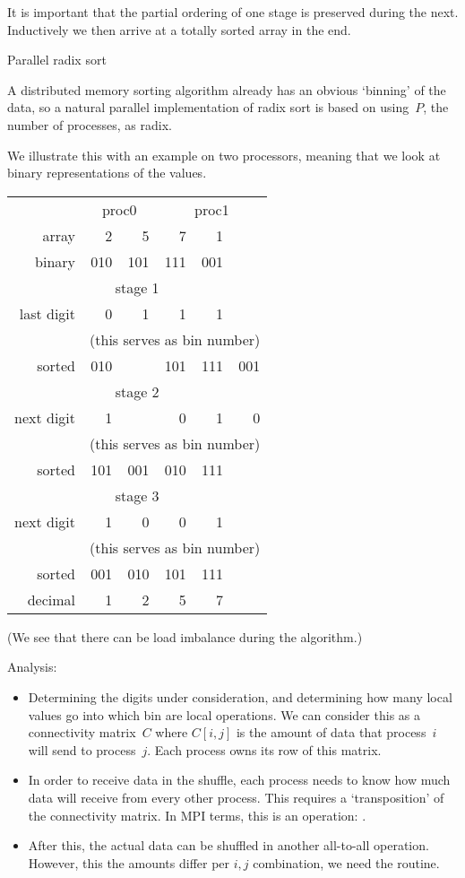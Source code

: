 It is important that the partial ordering of one stage is preserved
during the next. Inductively we then arrive at a totally sorted array
in the end.

 {Parallel radix sort}

A distributed memory sorting algorithm already has an obvious
`binning' of the data, so a natural parallel implementation of radix
sort is based on using~$P$, the number of processes, as radix.

We illustrate this with an example on two processors, meaning that we
look at binary representations of the values.

\begin{tabular}{|r|rr|rrr|}
  \hline
            & \multicolumn{2}{|c}{proc0}&\multicolumn{3}{|c|}{proc1}\\
  array     & 2&5&7&1&\\
  binary    & 010& 101& 111& 001&\\
  \hline
  \multicolumn{6}{|c|}{stage 1}\\
  \hline
  last digit&   0&   1&   1&   1&\\
  &\multicolumn{5}{|c|}{(this serves as bin number)}\\
  sorted    & 010&    & 101& 111& 001\\
  \multicolumn{6}{|c|}{stage 2}\\
  \hline
  next digit&  1 &    &  0 &  1 &  0\\
  &\multicolumn{5}{|c|}{(this serves as bin number)}\\
  sorted    & 101& 001& 010& 111&\\
  \multicolumn{6}{|c|}{stage 3}\\
  \hline
  next digit& 1  & 0  & 0  & 1&\\
  &\multicolumn{5}{|c|}{(this serves as bin number)}\\
  sorted    & 001& 010& 101& 111&\\
  decimal   & 1  & 2  & 5  & 7&\\
  \hline
\end{tabular}

(We see that there can be load imbalance during the algorithm.)

Analysis:
\begin{itemize}
\item Determining the digits under consideration, and determining how
  many local values go into which bin are local operations. We can
  consider this as a connectivity matrix~$C$ where $C[i,j]$ is the
  amount of data that process~$i$ will send to process~$j$. Each
  process owns its row of this matrix.
\item In order to receive data in the shuffle, each process needs to know
  how much data will receive from every other process. This requires a
  `transposition' of the connectivity matrix. In MPI terms, this is an
   operation: .
\item After this, the actual data can be shuffled in another
  all-to-all operation. However, this the amounts differ per $i,j$
  combination, we need the  routine.
\end{itemize}

